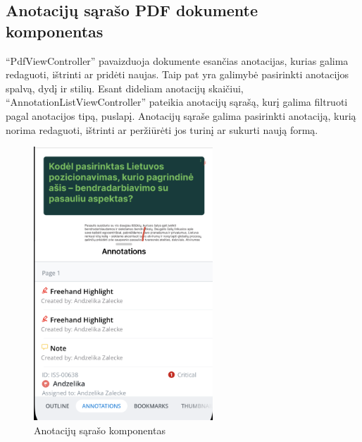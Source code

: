 \subsection{Anotacijų sąrašo PDF dokumente komponentas}
\enquote{PdfViewController} pavaizduoja dokumente esančias anotacijas, kurias galima redaguoti, ištrinti ar pridėti naujas.
 Taip pat yra galimybė pasirinkti anotacijos spalvą, dydį ir stilių. Esant dideliam anotacijų skaičiui, \enquote{AnnotationListViewController} pateikia anotacijų sąrašą, kurį galima filtruoti pagal anotacijos tipą, puslapį.
 Anotacijų sąraše galima pasirinkti anotaciją, kurią norima redaguoti, ištrinti ar peržiūrėti jos turinį ar sukurti naują formą. 
\begin{figure}[htbp!]
    \centering
    \includegraphics[width=0.6\textwidth]{Images/annotationList.png}
    \caption{Anotacijų sąrašo komponentas}
    \label{img:annotationList}
\end{figure}
\newpage
